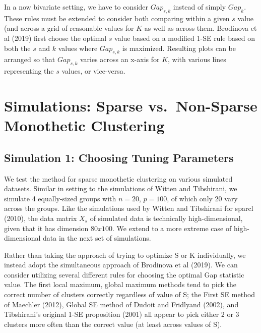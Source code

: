 \documentclass[
]{article}
\begin{document}
In a now bivariate setting, we have to consider \(Gap_{s,k}\) instead of
simply \(Gap_{k}\). These rules must be extended to consider both
comparing within a given \(s\) value (and across a grid of reasonable
values for \(K\) as well as across them. Brodinova et al (2019) first
choose the optimal \(s\) value based on a modified 1-SE rule based on
both the \(s\) and \(k\) values where \(Gap_{s,k}\) is maximized.
Resulting plots can be arranged so that \(Gap_{s,k}\) varies across an
x-axis for \(K\), with various lines representing the \(s\) values, or
vice-versa.

\hypertarget{simulations-sparse-vs.-non-sparse-monothetic-clustering}{%
\section{Simulations: Sparse vs.~Non-Sparse Monothetic
Clustering}\label{simulations-sparse-vs.-non-sparse-monothetic-clustering}}

\hypertarget{simulation-1-choosing-tuning-parameters}{%
\subsection{Simulation 1: Choosing Tuning
Parameters}\label{simulation-1-choosing-tuning-parameters}}

We test the method for sparse monothetic clustering on various simulated
datasets. Similar in setting to the simulations of Witten and
Tibshirani, we simulate 4 equally-sized groups with \(n = 20\),
\(p = 100\), of which only \(20\) vary across the groups. Like the
simulations used by Witten and Tibshirani for sparcl (2010), the data
matrix \(X_s\) of simulated data is technically high-dimensional, given
that it has dimension \(80 x 100\). We extend to a more extreme case of
high-dimensional data in the next set of simulations.

Rather than taking the approach of trying to optimize S or K
individually, we instead adopt the simultaneous approach of Brodinova et
al (2019). We can consider utilizing several different rules for
choosing the optimal Gap statistic value. The first local maximum,
global maximum methods tend to pick the correct number of clusters
correctly regardless of value of S; the First SE method of Maechler
(2012), Global SE method of Dudoit and Fridlyand (2002), and
Tibshirani's original 1-SE proposition (2001) all appear to pick either
2 or 3 clusters more often than the correct value (at least across
values of S).
\end{document}
